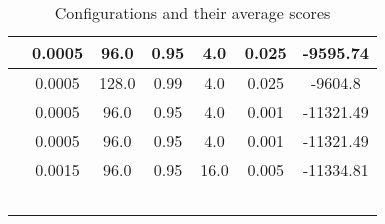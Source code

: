 \begin{table}[h]
\begin{tabular}{|c|c|c|c|c|c|c|}
\hline
[256.0, 128.0, 256.0] & 0.0005 & 96.0 & 0.95 & 4.0 & 0.025 & -9595.74 \\
\hline
[256.0, 128.0, 256.0] & 0.0005 & 128.0 & 0.99 & 4.0 & 0.025 & -9604.8 \\
\hline
[256.0, 128.0, 256.0] & 0.0005 & 96.0 & 0.95 & 4.0 & 0.001 & -11321.49 \\
\hline
[32.0, 256.0] & 0.0005 & 96.0 & 0.95 & 4.0 & 0.001 & -11321.49 \\
\hline
[256.0, 128.0, 256.0] & 0.0015 & 96.0 & 0.95 & 16.0 & 0.005 & -11334.81 \\
\hline
 &  &  &  &  \\
\hline
 &  &  &  &  \\
\hline
 &  &  &  &  \\
\hline
 &  &  &  &  \\
\hline
 &  &  &  &  \\
\hline
\end{tabular}
\caption{Configurations and their average scores}
\label{tab:config_scores}
\end{table}
